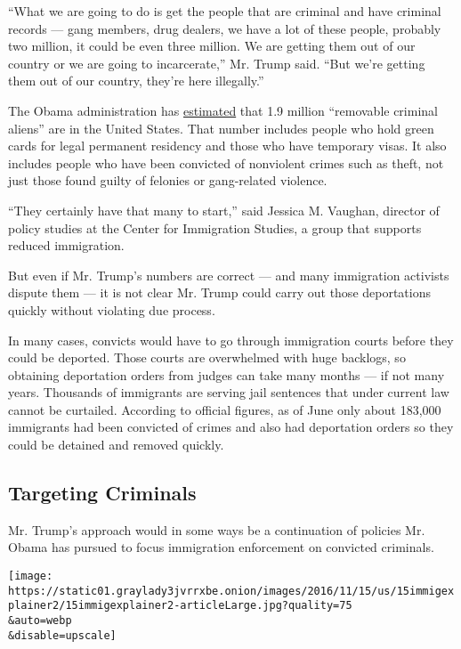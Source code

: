 ``What we are going to do is get the people that are criminal and have
criminal records --- gang members, drug dealers, we have a lot of these
people, probably two million, it could be even three million. We are
getting them out of our country or we are going to incarcerate,'' Mr.
Trump said. ``But we're getting them out of our country, they're here
illegally.''

The Obama administration has
\href{https://www.dhs.gov/sites/default/files/publications/dhs-congressional-budget-justification-fy2013.pdf}{estimated}
that 1.9 million ``removable criminal aliens'' are in the United States.
That number includes people who hold green cards for legal permanent
residency and those who have temporary visas. It also includes people
who have been convicted of nonviolent crimes such as theft, not just
those found guilty of felonies or gang-related violence.

``They certainly have that many to start,'' said Jessica M. Vaughan,
director of policy studies at the Center for Immigration Studies, a
group that supports reduced immigration.

But even if Mr. Trump's numbers are correct --- and many immigration
activists dispute them --- it is not clear Mr. Trump could carry out
those deportations quickly without violating due process.

In many cases, convicts would have to go through immigration courts
before they could be deported. Those courts are overwhelmed with huge
backlogs, so obtaining deportation orders from judges can take many
months --- if not many years. Thousands of immigrants are serving jail
sentences that under current law cannot be curtailed. According to
official figures, as of June only about 183,000 immigrants had been
convicted of crimes and also had deportation orders so they could be
detained and removed quickly.

\hypertarget{targeting-criminals}{%
\subsection{Targeting Criminals}\label{targeting-criminals}}

Mr. Trump's approach would in some ways be a continuation of policies
Mr. Obama has pursued to focus immigration enforcement on convicted
criminals.

\texttt{[image: https://static01.graylady3jvrrxbe.onion/images/2016/11/15/us/15immigexplainer2/15immigexplainer2-articleLarge.jpg?quality=75\\\&auto=webp\\\&disable=upscale]}

